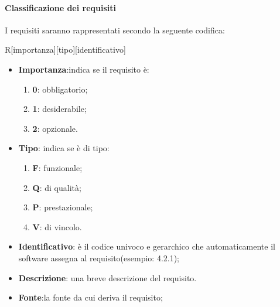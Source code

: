 		\paragraph{Classificazione  dei requisiti}
		I requisiti saranno rappresentati secondo la seguente codifica:
		\begin{center}
			R[importanza][tipo][identificativo]
		\end{center}
		\begin{itemize}
			\item \textbf{Importanza}:indica se il requisito è:
			\begin{enumerate}
				\item \textbf{0}: obbligatorio;
				\item \textbf{1}: desiderabile;
				\item \textbf{2}: opzionale.
			\end{enumerate}
			\item \textbf{Tipo}: indica se è di tipo:
			\begin{enumerate}
				\item \textbf{F}: funzionale;
				\item \textbf{Q}: di qualità;
				\item \textbf{P}: prestazionale;
				\item \textbf{V}: di vincolo.
			\end{enumerate}
			\item \textbf{Identificativo}: è il codice univoco e gerarchico che automaticamente il software assegna al requisito(esempio: 4.2.1);
			\item \textbf{Descrizione}: una breve descrizione del requisito.
			\item \textbf{Fonte}:la fonte da cui deriva il requisito;
		\end{itemize}
